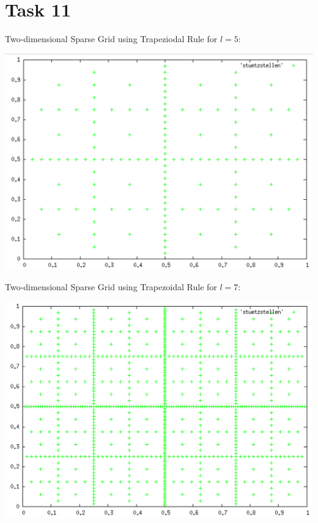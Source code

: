 \documentclass[10pt,a4paper]{article}
\begin{document}
\section*{Task 11}

Two-dimensional Sparse Grid using Trapeziodal Rule for $l=5$:
\begin{center}
\includegraphics[scale=0.5]{sparse_grid_l5.png}	
\end{center}
\newpage
Two-dimensional Sparse Grid using Trapezoidal Rule for $l=7$:
\begin{center}
\includegraphics[scale=0.5]{sparse_grid_l7.png}	
\end{center}
\end{document}
